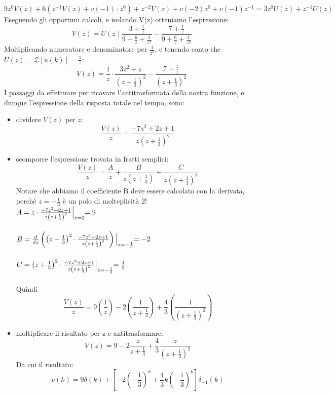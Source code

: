 \documentclass[12pt,a4paper]{article}
\begin{document}
\begin{enumerate}
\[		\]
		\[
			9z^0V(z) + 6\left(z^{-1}V(z) + v(-1) \cdot z^0\right) + z^{-2} V(z) + v(-2)z^0 + v(-1)z^{-1} = 3z^0U(z) + z^{-1}U(z)
		\]
		Eseguendo gli opportuni calcoli, e isolando V(z) otteniamo l'espressione:
		\[
			V(z) = U(z) \frac{3+\frac{1}{z}}{9+\frac{6}{z} + \frac{1}{z^2}} - \frac{7 + \frac{1}{z}}{9 + \frac{6}{z} + \frac{1}{z^2}}
		\]
		Moltiplicando numeratore e denominatore per $\frac{1}{z^2}$, e tenendo conto che $U(z) = \mathcal{Z}\left[u(k)\right] = \frac{1}{z}$:
		\[
			V(z) = \frac{1}{z} \cdot \frac{3z^2+z}{\left(z+\frac{1}{3}\right)^2} - \frac{7 + \frac{1}{z}}{\left(z+\frac{1}{3}\right)^2}
		\]
		I passaggi da effettuare per ricavare l'antitrasformata della nostra funzione, e dunque l'espressione della risposta totale nel tempo, sono:
		\begin{itemize}
			\item dividere $V(z)$ per $z$:
				\[
					\frac{V(z)}{z} = \frac{-7z^2+2z+1}{z\left(z+\frac{1}{3}\right)^2}
				\]
			\item scomporre l'espressione trovata in fratti semplici:
				\[
					\frac{V(z)}{z} = \frac{A}{z} + \frac{B}{z\left(z+\frac{1}{3}\right)} + \frac{C}{z\left(z+\frac{1}{3}\right)^2}
				\]
				Notare che abbiamo il coefficiente B deve essere calcolato con la derivata, perché $z = -\frac{1}{3}$ \`e un polo di molteplicit\`a 2!\\
				$A = z \cdot \frac{-7z^2+2z+1}{z\left(z+\frac{1}{3}\right)^2} \Bigl\lvert_{z = 0} = 9$ \\ \\
				$B = \frac{d}{dz}\left(\left( z + \frac{1}{3}\right)^2 \cdot \frac{-7z^2+2z+1}{z\left(z+\frac{1}{3}\right)^2} \right)\Bigl\lvert_{z = -\frac{1}{3}}=-2$\\ \\
				$C = \left(z + \frac{1}{3}\right)^2 \cdot \frac{-7z^2+2z+1}{z\left(z+\frac{1}{3}\right)^2} \Bigl\lvert_{z = -\frac{1}{3}} = \frac{4}{3}$\\ \\
				Quindi
				\[
					\frac{V(z)}{z} = 9\left(\frac{1}{z}\right) - 2\left(\frac{1}{z+\frac{1}{3}}\right) +
					\frac{4}{3}\left(\frac{1}{\left(z + \frac{1}{3}\right)^2}\right)
				\]
			\item moltiplicare il risultato per z e antitrasformare:
			\[
				V(z) = 9 - 2\frac{z}{z+\frac{1}{3}} + \frac{4}{3}\frac{z}{\left(z+\frac{1}{3}\right)^2}
			\]
			Da cui il risultato:
			\[
				v(k) = 9\delta (k) + \left[-2\left(-\frac{1}{3}\right)^k + \frac{4}{3}k\left(-\frac{1}{3}\right)^k\right]\delta_{-1}(k)
			\]
		\end{itemize}
	\end{enumerate}
	\newpage
\end{document}
